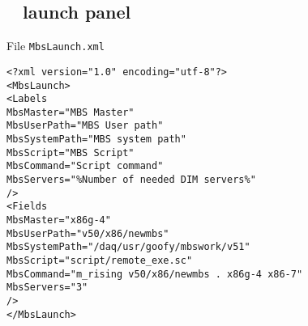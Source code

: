 \subsection{\mbs~ launch panel}
File {\tt MbsLaunch.xml}
\begin{verbatim}
<?xml version="1.0" encoding="utf-8"?>
<MbsLaunch>
<Labels
MbsMaster="MBS Master"
MbsUserPath="MBS User path"
MbsSystemPath="MBS system path"
MbsScript="MBS Script"
MbsCommand="Script command"
MbsServers="%Number of needed DIM servers%"
/>
<Fields
MbsMaster="x86g-4"
MbsUserPath="v50/x86/newmbs"
MbsSystemPath="/daq/usr/goofy/mbswork/v51"
MbsScript="script/remote_exe.sc"
MbsCommand="m_rising v50/x86/newmbs . x86g-4 x86-7"
MbsServers="3"
/>
</MbsLaunch>
\end{verbatim}

